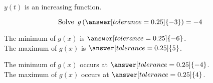 \documentclass{ximera}
\begin{document}
\begin{exercise}
\begin{question} 



$y(t)$ is an increasing function.
\begin{multipleChoice}
\end{multipleChoice}

\end{question}





\begin{question} 



\[  \text{Solve } \, g\left( \answer[tolerance=0.25]{-3} \right) = -4  \]

\end{question}






\begin{question} 



The minimum of $g(x)$ is $\answer[tolerance=0.25]{-6}$.   \\

The maximum of $g(x)$ is $\answer[tolerance=0.25]{5}$.
 

\end{question}






\begin{question} 


The minimum of $g(x)$ occurs at $\answer[tolerance=0.25]{-4}$.   \\

The maximum of $g(x)$ occurs at $\answer[tolerance=0.25]{4}$.

\end{question}









\end{exercise}
\end{document}
